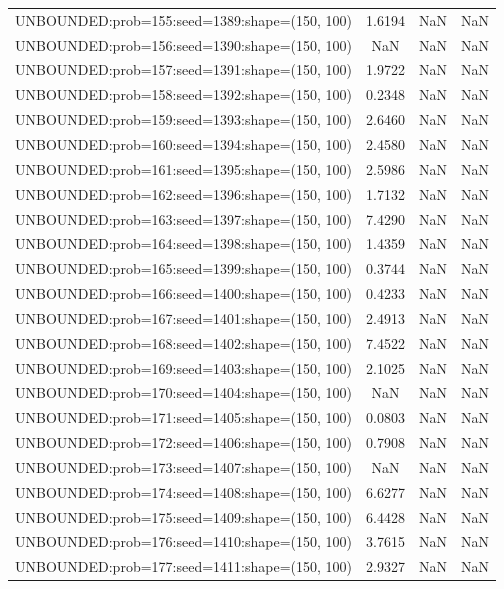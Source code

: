 \begin{longtable}{lccc}
UNBOUNDED:prob=155:seed=1389:shape=(150, 100) &  1.6194 &   NaN &    NaN \\
UNBOUNDED:prob=156:seed=1390:shape=(150, 100) &     NaN &   NaN &    NaN \\
UNBOUNDED:prob=157:seed=1391:shape=(150, 100) &  1.9722 &   NaN &    NaN \\
UNBOUNDED:prob=158:seed=1392:shape=(150, 100) &  0.2348 &   NaN &    NaN \\
UNBOUNDED:prob=159:seed=1393:shape=(150, 100) &  2.6460 &   NaN &    NaN \\
UNBOUNDED:prob=160:seed=1394:shape=(150, 100) &  2.4580 &   NaN &    NaN \\
UNBOUNDED:prob=161:seed=1395:shape=(150, 100) &  2.5986 &   NaN &    NaN \\
UNBOUNDED:prob=162:seed=1396:shape=(150, 100) &  1.7132 &   NaN &    NaN \\
UNBOUNDED:prob=163:seed=1397:shape=(150, 100) &  7.4290 &   NaN &    NaN \\
UNBOUNDED:prob=164:seed=1398:shape=(150, 100) &  1.4359 &   NaN &    NaN \\
UNBOUNDED:prob=165:seed=1399:shape=(150, 100) &  0.3744 &   NaN &    NaN \\
UNBOUNDED:prob=166:seed=1400:shape=(150, 100) &  0.4233 &   NaN &    NaN \\
UNBOUNDED:prob=167:seed=1401:shape=(150, 100) &  2.4913 &   NaN &    NaN \\
UNBOUNDED:prob=168:seed=1402:shape=(150, 100) &  7.4522 &   NaN &    NaN \\
UNBOUNDED:prob=169:seed=1403:shape=(150, 100) &  2.1025 &   NaN &    NaN \\
UNBOUNDED:prob=170:seed=1404:shape=(150, 100) &     NaN &   NaN &    NaN \\
UNBOUNDED:prob=171:seed=1405:shape=(150, 100) &  0.0803 &   NaN &    NaN \\
UNBOUNDED:prob=172:seed=1406:shape=(150, 100) &  0.7908 &   NaN &    NaN \\
UNBOUNDED:prob=173:seed=1407:shape=(150, 100) &     NaN &   NaN &    NaN \\
UNBOUNDED:prob=174:seed=1408:shape=(150, 100) &  6.6277 &   NaN &    NaN \\
UNBOUNDED:prob=175:seed=1409:shape=(150, 100) &  6.4428 &   NaN &    NaN \\
UNBOUNDED:prob=176:seed=1410:shape=(150, 100) &  3.7615 &   NaN &    NaN \\
UNBOUNDED:prob=177:seed=1411:shape=(150, 100) &  2.9327 &   NaN &    NaN \\

\end{longtable}
